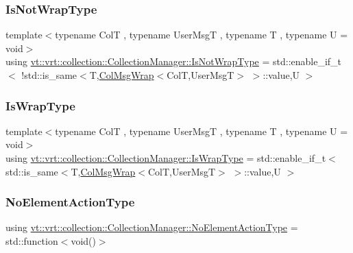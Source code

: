 \subsubsection{\texorpdfstring{Is\+Not\+Wrap\+Type}{IsNotWrapType}}
{\footnotesize\ttfamily template$<$typename ColT , typename User\+MsgT , typename T , typename U  = void$>$ \\
using \hyperlink{structvt_1_1vrt_1_1collection_1_1_collection_manager_a18e3a17d9eb086c6c2f499242b7faa1e}{vt\+::vrt\+::collection\+::\+Collection\+Manager\+::\+Is\+Not\+Wrap\+Type} =  std\+::enable\+\_\+if\+\_\+t$<$ !std\+::is\+\_\+same$<$T,\hyperlink{structvt_1_1vrt_1_1collection_1_1_col_msg_wrap}{Col\+Msg\+Wrap}$<$ColT,User\+MsgT$>$ $>$\+::value,U $>$}

\mbox{\label{structvt_1_1vrt_1_1collection_1_1_collection_manager_a1f91c97ed52237c3a3576dfbbe87c8f8}} 
\subsubsection{\texorpdfstring{Is\+Wrap\+Type}{IsWrapType}}
{\footnotesize\ttfamily template$<$typename ColT , typename User\+MsgT , typename T , typename U  = void$>$ \\
using \hyperlink{structvt_1_1vrt_1_1collection_1_1_collection_manager_a1f91c97ed52237c3a3576dfbbe87c8f8}{vt\+::vrt\+::collection\+::\+Collection\+Manager\+::\+Is\+Wrap\+Type} =  std\+::enable\+\_\+if\+\_\+t$<$ std\+::is\+\_\+same$<$T,\hyperlink{structvt_1_1vrt_1_1collection_1_1_col_msg_wrap}{Col\+Msg\+Wrap}$<$ColT,User\+MsgT$>$ $>$\+::value,U $>$}

\mbox{\label{structvt_1_1vrt_1_1collection_1_1_collection_manager_a6b9b76aadc721cec45d3e0e02d849ff1}} 
\subsubsection{\texorpdfstring{No\+Element\+Action\+Type}{NoElementActionType}}
{\footnotesize\ttfamily using \hyperlink{structvt_1_1vrt_1_1collection_1_1_collection_manager_a6b9b76aadc721cec45d3e0e02d849ff1}{vt\+::vrt\+::collection\+::\+Collection\+Manager\+::\+No\+Element\+Action\+Type} =  std\+::function$<$void()$>$}

